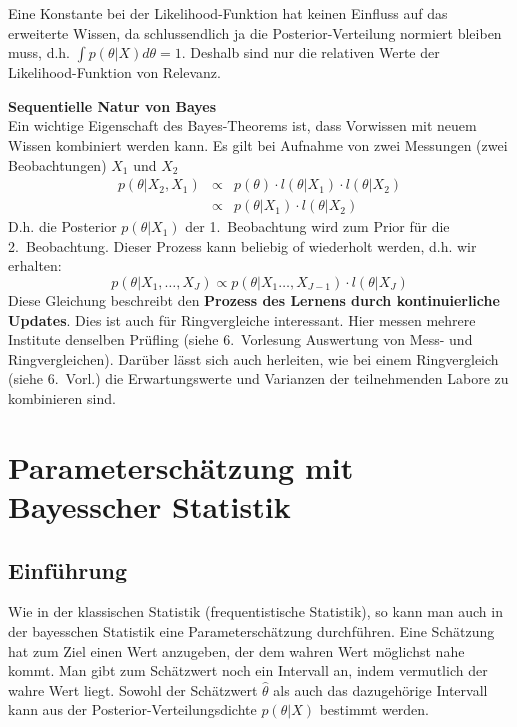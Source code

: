 Eine Konstante  bei der Likelihood-Funktion hat keinen Einfluss auf das erweiterte 
Wissen, da schlussendlich ja die Posterior-Verteilung normiert bleiben muss, d.h.
$\int p(\theta|X) d\theta =1$. Deshalb sind nur die relativen Werte der Likelihood-Funktion von Relevanz. 

\textbf{Sequentielle Natur von Bayes} \\
Ein wichtige Eigenschaft des Bayes-Theorems ist, dass Vorwissen mit
neuem Wissen kombiniert werden kann. Es gilt bei Aufnahme von zwei
Messungen (zwei Beobachtungen) $X_1$ und $X_2$
\[
\begin{array}{rcl}
p(\theta|X_2,X_1) &\propto& p(\theta) \cdot l(\theta|X_1) \cdot l(\theta | X_2) \\
&\propto& p(\theta|X_1) \cdot l(\theta|X_2)
\end{array}
\]
D.h. die Posterior $p(\theta|X_1)$ der 1.~Beobachtung wird zum Prior für die 
2.~Beobachtung. Dieser Prozess kann beliebig of wiederholt werden, d.h. wir
erhalten: 
\begin{equation}
p(\theta |X_1,\hdots,X_J) \propto p(\theta | X_1\hdots, X_{J-1}) \cdot l(\theta | X_J) 
\label{eq:Bayes_sequentiell}
\end{equation}
Diese Gleichung beschreibt den \textbf{Prozess des Lernens durch kontinuierliche Updates}. Dies ist auch für Ringvergleiche interessant. Hier messen mehrere 
Institute denselben Prüfling (siehe 6.~Vorlesung \glqq Auswertung von Mess- und Ringvergleichen\grqq). Darüber lässt sich auch herleiten, wie bei einem Ringvergleich (siehe 6.~Vorl.) die Erwartungswerte und Varianzen der teilnehmenden Labore zu kombinieren sind.

\section{Parameterschätzung mit Bayesscher Statistik}
\subsection{Einführung}
Wie in der klassischen Statistik (frequentistische Statistik), so kann man auch in der bayes\-schen Statistik eine Parameterschätzung durchführen. Eine Schätzung hat zum Ziel einen Wert anzugeben, der dem wahren Wert möglichst nahe kommt. Man gibt zum Schätzwert noch ein Intervall  an, indem vermutlich der wahre Wert liegt. Sowohl der Schätzwert $\hat{\theta}$ als auch das dazugehörige Intervall kann aus der Posterior-Ver\-teilungs\-dichte $p(\theta|X)$ bestimmt werden. 
